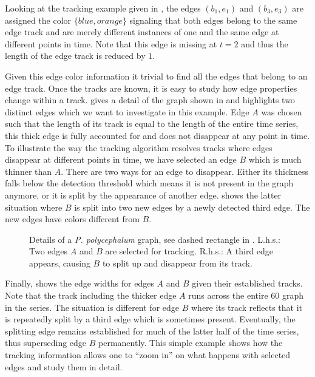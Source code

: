 	Looking at the tracking example given in , the edges $(b_1,e_1)$ and $(b_3,e_3)$ are assigned the color $\{blue, orange\}$ signaling that both edges belong to the same edge track and are merely different instances of one and the same edge at different points in time. Note that this edge is missing at $t=2$ and thus the length of the edge track is reduced by $1$.

	Given this edge color information it trivial to find all the edges that belong to an edge track. Once the tracks are known, it is easy to study how edge properties change within a track.  gives a detail of the graph shown in  and highlights two distinct edges which we want to investigate in this example. Edge $A$ was chosen such that the length of its track is equal to the length of the entire time series, \ie this thick edge is fully accounted for and does not disappear at any point in time. To illustrate the way the tracking algorithm resolves tracks where edges disappear at different points in time, we have selected an edge $B$ which is much thinner than $A$. There are two ways for an edge to disappear. Either its thickness falls below the detection threshold which means it is not present in the graph anymore, or it is split by the appearance of another edge.  shows the latter situation where $B$ is split into two new edges by a newly detected third edge. The new edges have colors different from $B$.

	\begin{figure}
		\centering
		\qquad
		\caption[Demo: Tracking of individual edges]{Details of a \emph{P. polycephalum} graph, see dashed rectangle in . L.h.s.: Two edges $A$ and $B$ are selected for tracking. R.h.s.: A third edge appears, causing $B$ to split up and disappear from its track.}
    \end{figure}

    Finally,  shows the edge widths for edges $A$ and $B$ given their established tracks. Note that the track including the thicker edge $A$ runs across the entire $60$ graph in the series. The situation is different for edge $B$ where its track reflects that it is repeatedly split by a third edge which is sometimes present. Eventually, the splitting edge remains established for much of the latter half of the time series, thus superseding edge $B$ permanently. This simple example shows how the tracking information allows one to ``zoom in'' on what happens with selected edges and study them in detail.

